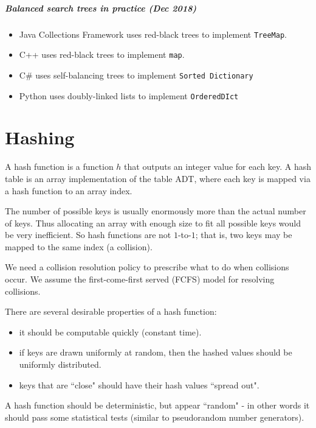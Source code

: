 \paragraph{Balanced search trees in practice (Dec 2018)}
\begin{itemize}
\item Java Collections Framework uses red-black trees to implement \texttt{TreeMap}.
\item C++  uses red-black trees to implement \texttt{map}.
\item C\# uses self-balancing trees to implement \texttt{Sorted Dictionary}
\item Python uses doubly-linked lists to implement \texttt{OrderedDIct}
\end{itemize}




\chapter{Hashing} %

\begin{Definition}
A \alert{hash function} is a function $h$ that outputs an integer
value for each key. A \alert{hash table} is an array implementation of
the table ADT, where each key is mapped via a hash function to an array
index. 
\item The number of possible keys is usually enormously more than
the actual number of keys. Thus allocating an array with enough size to
fit all possible keys would be very inefficient. So hash functions are
not $1$-to-$1$; that is, two keys may be mapped to the same index (a
\alert{collision}). 
\end{Definition}
We need a collision resolution policy to prescribe what to do when 
collisions occur. 
We assume the first-come-first served (FCFS) model for resolving
collisions.

There are several desirable properties of a hash function:
\begin{itemize}
\item it should be computable quickly (constant time).
\item if keys are drawn uniformly at random, then the hashed values
should be uniformly distributed. 
\item keys that are ``close" should have their hash values ``spread out". 
\end{itemize}
A hash function should be deterministic, but appear ``random" - in other 
words it should pass some statistical tests (similar to pseudorandom number generators). 

